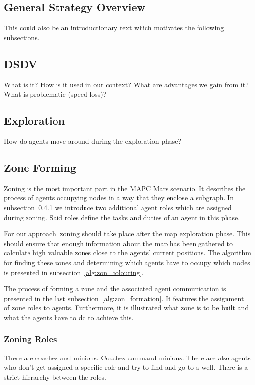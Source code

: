 \subsection{General Strategy Overview}
This could also be an introductionary text which motivates the following subsections.

\subsection{DSDV}
What is it? How is it used in our context? What are advantages we gain from it? What is problematic (speed loss)?

\subsection{Exploration}
How do agents move around during the exploration phase?

\subsection{Zone Forming}
Zoning is the most important part in the MAPC Mars scenario\cite{ahlbrecht_mapc_2014}.%
It describes the process of agents occupying nodes in a way that they enclose a subgraph. In subsection~\ref{alg:zon_roles} we introduce two additional agent roles which are assigned during zoning. Said roles define the tasks and duties of an agent in this phase.

For our approach, zoning should take place after the map exploration phase. This should ensure that enough information about the map has been gathered to calculate high valuable zones close to the agents' current positions. The algorithm for finding these zones and determining which agents have to occupy which nodes is presented in subsection~\ref{alg:zon_colouring}.

The process of forming a zone and the associated agent communication is presented in the last subsection~\ref{alg:zon_formation}. It features the assignment of zone roles to agents. Furthermore, it is illustrated what zone is to be built and what the agents have to do to achieve this.

\subsubsection{Zoning Roles}\label{alg:zon_roles}
There are coaches and minions. Coaches command minions. There are also agents who don't get assigned a specific role and try to find and go to a well. There is a strict hierarchy between the roles.

